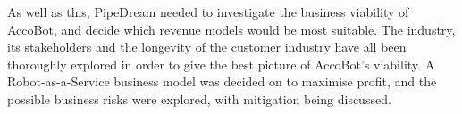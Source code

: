 \documentclass[11pt]{article}		%
\newcommand{\supercite}[1]{\textsuperscript{\cite{#1}}}		%
\begin{document}
        As well as this, PipeDream needed to investigate the business viability of AccoBot, and decide which revenue models would be most suitable.
        The industry, its stakeholders and the longevity of the customer industry have all been thoroughly explored in order to give the best picture of AccoBot's viability.
        A Robot-as-a-Service business model was decided on to maximise profit, and the possible business risks were explored, with mitigation being discussed.

	\pagebreak		%
	
	
	
	
		\begingroup\onehalfspacing
			{\small
				
				
			}
		\endgroup
	
\end{document}
